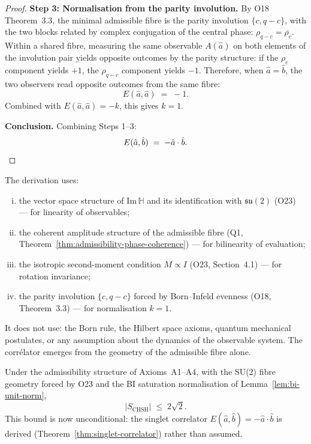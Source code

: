 \begin{proof}
  \textbf{Step 3: Normalisation from the parity involution.}
  By O18 Theorem~3.3, the minimal admissible fibre is the parity involution
  $\{c, q-c\}$, with the two blocks related by complex conjugation of the
  central phase: $\rho_{q-c} = \overline{\rho_c}$.
  Within a shared fibre, measuring the same observable $A(\hat{a})$ on both
  elements of the involution pair yields opposite outcomes by the parity
  structure: if the $\rho_c$ component yields $+1$, the $\rho_{q-c}$ component
  yields $-1$.
  Therefore, when $\hat{a} = \hat{b}$, the two observers read opposite outcomes
  from the same fibre:
  \begin{equation}
    E(\hat{a}, \hat{a}) \;=\; -1.
  \end{equation}
  Combined with $E(\hat{a},\hat{a}) = -k$, this gives $k = 1$.

  \textbf{Conclusion.}
  Combining Steps 1--3:
  \begin{equation}
    E(\hat{a}, \hat{b}) \;=\; -\hat{a} \cdot \hat{b}. \qedhere
  \end{equation}
\end{proof}

\begin{remark}
  \label{rem:singlet-inputs}
  The derivation uses:
  \begin{enumerate}[(i)]
  \item the vector space structure of $\mathrm{Im}\,\mathbb{H}$ and its
  identification with $\mathfrak{su}(2)$ (O23) — for linearity of observables;
  \item the coherent amplitude structure of the admissible fibre (Q1,
  Theorem~\ref{thm:admissibility-phase-coherence}) — for bilinearity of
  evaluation;
  \item the isotropic second-moment condition $M \propto I$ (O23, Section~4.1)
  — for rotation invariance;
  \item the parity involution $\{c, q-c\}$ forced by Born--Infeld evenness
  (O18, Theorem~3.3) — for normalisation $k = 1$.
  \end{enumerate}
  It does not use: the Born rule, the Hilbert space axioms, quantum mechanical
  postulates, or any assumption about the dynamics of the observable system.
  The corrélator emerges from the geometry of the admissible fibre alone.
\end{remark}

\begin{corollary}
  \label{cor:tsirelson-unconditional}
  Under the admissibility structure of Axioms~A1--A4, with the SU(2) fibre
  geometry forced by O23 and the BI saturation normalisation of
  Lemma~\ref{lem:bi-unit-norm},
  \begin{equation}
    |S_{\mathrm{CHSH}}| \;\leq\; 2\sqrt{2}.
  \end{equation}
  This bound is now unconditional: the singlet correlator
  $E(\hat{a},\hat{b}) = -\hat{a}\cdot\hat{b}$ is derived
  (Theorem~\ref{thm:singlet-correlator}) rather than assumed.
\end{corollary}

